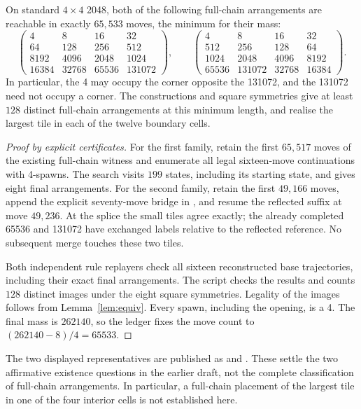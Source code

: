 \begin{theorem}\label{thm:arrangements}
On standard $4\times4$ 2048, both of the following full-chain arrangements
are reachable in exactly $65{,}533$ moves, the minimum for their mass:
\[
\begin{pmatrix}
4&8&16&32\\
64&128&256&512\\
8192&4096&2048&1024\\
16384&32768&65536&131072
\end{pmatrix},\qquad
\begin{pmatrix}
4&8&16&32\\
512&256&128&64\\
1024&2048&4096&8192\\
65536&131072&32768&16384
\end{pmatrix}.
\]
In particular, the 4 may occupy the corner opposite the 131072, and the
131072 need not occupy a corner. The constructions and square symmetries
give at least $128$ distinct full-chain arrangements at this minimum
length, and realise the largest tile in each of the twelve boundary cells.
\end{theorem}
\begin{proof}[Proof by explicit certificates]
For the first family, retain the first $65{,}517$ moves of the existing
full-chain witness and enumerate all legal sixteen-move continuations
with 4-spawns. The search visits $199$ states, including its starting
state, and gives eight final arrangements. For the second family, retain
the first $49{,}166$ moves, append the explicit seventy-move bridge in
, and resume the reflected suffix
at move $49{,}236$. At the splice the small tiles agree exactly; the
already completed 65536 and 131072 have exchanged labels relative to
the reflected reference. No subsequent merge touches these two tiles.

Both independent rule replayers check all sixteen reconstructed base
trajectories, including their exact final arrangements.
The script  checks the results
and counts $128$ distinct images under the eight square symmetries.
Legality of the images follows from Lemma~\ref{lem:equiv}.
Every spawn, including the opening, is a 4. The final mass is
$262140$, so the ledger fixes the move count to $(262140-8)/4=65533$.
\end{proof}

The two displayed representatives are published as
 and
. These settle the two affirmative
existence questions in the earlier draft, not the complete classification
of full-chain arrangements. In particular, a full-chain placement of the
largest tile in one of the four interior cells is not established here.

